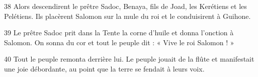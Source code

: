 
38 Alors descendirent le prêtre Sadoc, Benaya, fils de Joad, les Kerétiens et les Pelétiens. Ils placèrent Salomon sur la mule du roi et le conduisirent à Guihone.

39 Le prêtre Sadoc prit dans la Tente la corne d’huile et donna l’onction à Salomon. On sonna du cor et tout le peuple dit : « Vive le roi Salomon ! »

40 Tout le peuple remonta derrière lui. Le peuple jouait de la flûte et manifestait une joie débordante, au point que la terre se fendait à leurs voix.